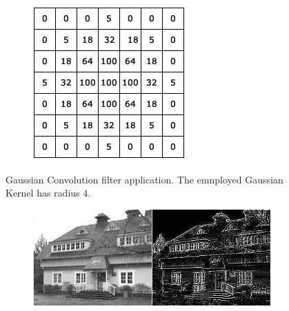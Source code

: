 {\begin{figure}
\begin{subfigure}{1.0\textwidth}
			
	\end{subfigure}
	
	\endminipage\hfill
	\begin{subfigure}{0.9\textwidth}
		\includegraphics[width=\linewidth]{./images/opencal/conv-gaussian-blur}	
	\end{subfigure}
	\endminipage\hfill
	\caption{Gaussian Convolution filter application. The emnployed Gaussian Kernel has radius $4$.}
	\label{fig:gaussian}
\end{figure}


\begin{figure}[!htb]
	\begin{subfigure}{1.0\textwidth}
		\includegraphics[width=\linewidth]{./images/opencal/sobel_example}
	\end{subfigure}
	

\end{figure}}
